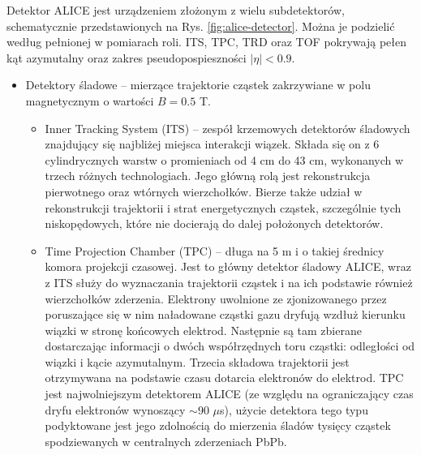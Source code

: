 Detektor ALICE jest urządzeniem złożonym z wielu subdetektorów, schematycznie przedstawionych na Rys. \ref{fig:alice-detector}. Można je podzielić według pełnionej w pomiarach roli. 
ITS, TPC, TRD oraz TOF pokrywają pełen kąt azymutalny oraz zakres pseudopospieszności $|\eta| < 0.9$.
\begin{itemize}
	\item Detektory śladowe -- mierzące trajektorie cząstek zakrzywiane w polu magnetycznym o wartości $B = 0.5$ T.
	\begin{itemize}
		\item Inner Tracking System (ITS) -- zespół krzemowych detektorów śladowych znajdujący się najbliżej miejsca interakcji wiązek. Składa się on z 6 cylindrycznych warstw o promieniach od 4 cm do 43 cm, wykonanych w trzech różnych technologiach. Jego główną rolą jest rekonstrukcja pierwotnego oraz wtórnych wierzchołków. Bierze także udział w rekonstrukcji trajektorii i strat energetycznych cząstek, szczególnie tych niskopędowych, które nie docierają do dalej położonych detektorów.
		\item Time Projection Chamber (TPC) -- długa na 5 m i o takiej średnicy komora projekcji czasowej. Jest to główny detektor śladowy ALICE, wraz z ITS służy do wyznaczania trajektorii cząstek i na ich podstawie również wierzchołków zderzenia. Elektrony uwolnione ze zjonizowanego przez poruszające się w nim naładowane cząstki gazu dryfują wzdłuż kierunku wiązki w stronę końcowych elektrod. Następnie są tam zbierane dostarczając informacji o dwóch współrzędnych toru cząstki: odległości od wiązki i kącie azymutalnym. Trzecia składowa trajektorii jest otrzymywana na podstawie czasu dotarcia elektronów do elektrod. TPC jest najwolniejszym detektorem ALICE (ze względu na ograniczający czas dryfu elektronów wynoszący $\sim$90 $\mu$s), użycie detektora tego typu podyktowane jest jego zdolnością do mierzenia śladów tysięcy cząstek spodziewanych w centralnych zderzeniach PbPb.
		

\end{itemize}
\end{itemize}
